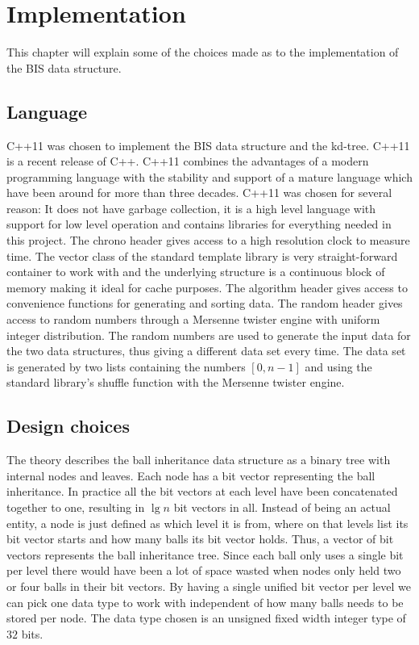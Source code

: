 \chapter{Implementation}
\label{ch:implementation}

This chapter will explain some of the choices made as to the implementation of the BIS data structure.

\section{Language}

C++11 was chosen to implement the BIS data structure and the kd-tree. C++11 is a recent release of C++. C++11 combines the advantages of a modern programming language with the stability and support of a mature language which have been around for more than three decades. C++11 was chosen for several reason: It does not have garbage collection, it is a high level language with support for low level operation and contains libraries for everything needed in this project. The chrono header gives access to a high resolution clock to measure time. The vector class of the standard template library is very straight-forward container to work with and the underlying structure is a continuous block of memory making it ideal for cache purposes. The algorithm header gives access to convenience functions for generating and sorting data. The random header gives access to random numbers through a Mersenne twister engine with uniform integer distribution. The random numbers are used to generate the input data for the two data structures, thus giving a different data set every time. The data set is generated by two lists containing the numbers $[0,n-1]$ and using the standard library's shuffle function with the Mersenne twister engine. 

\section{Design choices}

The theory describes the ball inheritance data structure as a binary tree with internal nodes and leaves. Each node has a bit vector representing the ball inheritance. In practice all the bit vectors at each level have been concatenated together to one, resulting in $\lg n$ bit vectors in all. Instead of being an actual entity, a node is just defined as which level it is from, where on that levels list its bit vector starts and how many balls its bit vector holds. Thus, a vector of bit vectors represents the ball inheritance tree. Since each ball only uses a single bit per level there would have been a lot of space wasted when nodes only held two or four balls in their bit vectors. By having a single unified bit vector per level we can pick one data type to work with independent of how many balls needs to be stored per node. The data type chosen is an unsigned fixed width integer type of $32$ bits. \\

